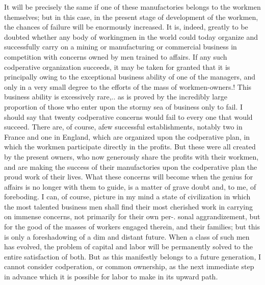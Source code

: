 \documentclass[11pt,openany]{book}
\begin{document}
It will be precisely the same if one of these manufactories belongs to the workmen themselves; but in this case, in the present stage of development of the workmen, the chances of failure will be enormously increased. It is, indeed, greatly to be doubted whether any body of workingmen in the world could today organize and successfully carry on a mining or manufacturing or commercial business in competition with concerns owned by men trained to affairs. If any such codperative organization succeeds, it may be taken for granted that it is principally owing to the exceptional business ability of one of the managers, and only in a very small degree to the efforts of the mass of workmen-owners.! This business ability is excessively rare,.. as is proved by the incredibly large proportion of those who enter upon the stormy sea of business only to fail. I should say that twenty codperative concerns would fail to every one that would succeed. There are, of course, afew successful establishments, notably two in France and one in England, which are organized upon the codperative plan, in which the workmen participate directly in the profits. But these were all created by the present owners, who now generously share the profits with their workmen, and are making the success of their manufactories upon the codperative plan the proud work of their lives. What these concerns will become when the genius for affairs is no longer with them to guide, is a matter of grave doubt and, to me, of foreboding. I can, of course, picture in my mind a state of civilization in which the most talented business men shall find their most cherished work in carrying on immense concerns, not primarily for their own per-. sonal aggrandizement, but for the good of the masses of workers engaged therein, and their families; but this is only a foreshadowing of a dim and distant future. When a class of such men has evolved, the problem of capital and labor will be permanently solved to the entire satisfaction of both. But as this manifestly belongs to a future generation, I cannot consider codperation, or common ownership, as the next immediate step in advance which it is possible for labor to make in its upward path.
\end{document}
